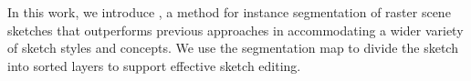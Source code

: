 In this work, we introduce \methodname{}, a method for instance segmentation of raster scene sketches that outperforms previous approaches in accommodating a wider variety of sketch styles and concepts. 
We use the segmentation map to divide the sketch into sorted layers to support effective sketch editing.

